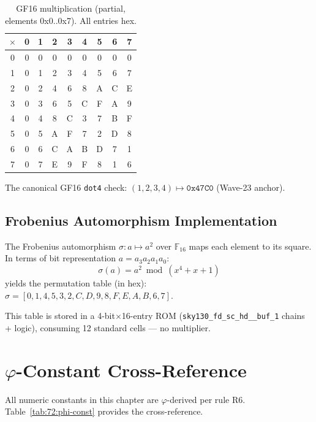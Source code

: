 \begin{table}[H]
\centering
\caption{GF16 multiplication (partial, elements 0x0..0x7). All entries hex.}
\label{tab:72:gf16-mult}
\small
\begin{tabular}{c|cccccccc}
$\times$ & 0 & 1 & 2 & 3 & 4 & 5 & 6 & 7 \\
\hline
0 & 0 & 0 & 0 & 0 & 0 & 0 & 0 & 0 \\
1 & 0 & 1 & 2 & 3 & 4 & 5 & 6 & 7 \\
2 & 0 & 2 & 4 & 6 & 8 & A & C & E \\
3 & 0 & 3 & 6 & 5 & C & F & A & 9 \\
4 & 0 & 4 & 8 & C & 3 & 7 & B & F \\
5 & 0 & 5 & A & F & 7 & 2 & D & 8 \\
6 & 0 & 6 & C & A & B & D & 7 & 1 \\
7 & 0 & 7 & E & 9 & F & 8 & 1 & 6 \\
\end{tabular}
\end{table}

\noindent
The canonical GF16 \texttt{dot4} check: $(1,2,3,4) \mapsto \mathtt{0x47C0}$
(Wave-23 anchor).

\subsection{Frobenius Automorphism Implementation}
\label{subsec:72:frobenius}

The Frobenius automorphism $\sigma: a \mapsto a^2$ over $\mathbb{F}_{16}$
maps each element to its square.
In terms of bit representation $a = a_3 a_2 a_1 a_0$:
\[
  \sigma(a) = a^2 \bmod (x^4 + x + 1)
\]
yields the permutation table (in hex):
$\sigma = [0, 1, 4, 5, 3, 2, C, D, 9, 8, F, E, A, B, 6, 7]$.

This table is stored in a 4-bit$\times$16-entry ROM (\texttt{sky130\_fd\_sc\_hd\_\_buf\_1}
chains + logic), consuming 12 standard cells — no multiplier.

\section{$\varphi$-Constant Cross-Reference}
\label{sec:72:phi-constants}

All numeric constants in this chapter are $\varphi$-derived
per rule R6. Table~\ref{tab:72:phi-const} provides the cross-reference.

